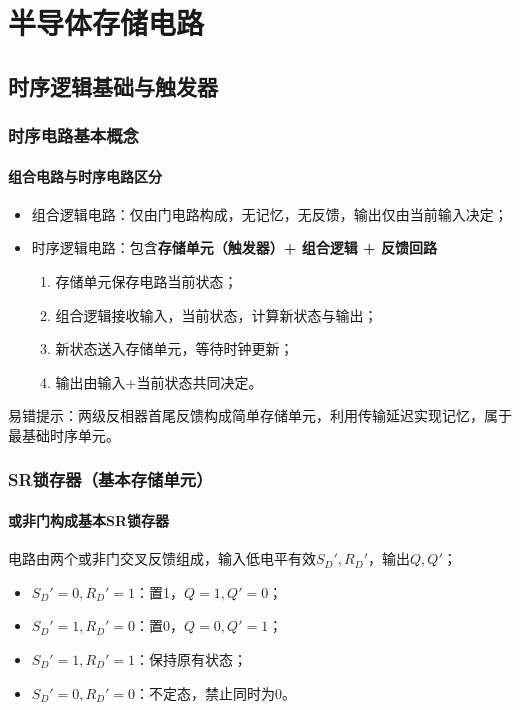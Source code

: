 \setlength{\parskip}{0.4em}
\setlength{\itemsep}{0.2em}
\setlength{\tabcolsep}{4pt}

\chapter{半导体存储电路}
\section{时序逻辑基础与触发器}
\subsection{时序电路基本概念}
\subsubsection{组合电路与时序电路区分}
\begin{itemize}
    \item 组合逻辑电路：仅由门电路构成，无记忆，无反馈，输出仅由当前输入决定；
    \item 时序逻辑电路：包含\textbf{存储单元（触发器）+ 组合逻辑 + 反馈回路}
    \begin{enumerate}
        \item 存储单元保存电路当前状态；
        \item 组合逻辑接收输入，当前状态，计算新状态与输出；
        \item 新状态送入存储单元，等待时钟更新；
        \item 输出由输入+当前状态共同决定。
    \end{enumerate}
\end{itemize}
\noindent 易错提示：两级反相器首尾反馈构成简单存储单元，利用传输延迟实现记忆，属于最基础时序单元。

\subsection{SR锁存器（基本存储单元）}
\subsubsection{或非门构成基本SR锁存器}
电路由两个或非门交叉反馈组成，输入低电平有效$S_D',R_D'$，输出$Q,Q'$；
\begin{itemize}
    \item $S_D'=0,R_D'=1$：置1，$Q=1,Q'=0$；
    \item $S_D'=1,R_D'=0$：置0，$Q=0,Q'=1$；
    \item $S_D'=1,R_D'=1$：保持原有状态；
    \item $S_D'=0,R_D'=0$：不定态，禁止同时为0。
\end{itemize}

